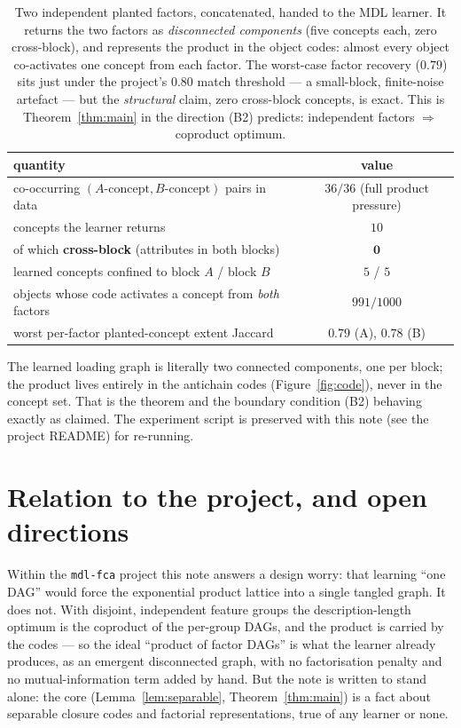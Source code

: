 \documentclass[11pt]{article}
\theoremstyle{definition}
\theoremstyle{plain}
\theoremstyle{remark}
\begin{document}
\begin{table}[h]
\centering
\begin{tabular}{lc}
\toprule
quantity & value \\
\midrule
co-occurring $(A\text{-concept},B\text{-concept})$ pairs in data & $36/36$ (full product pressure) \\
concepts the learner returns & $10$ \\
\quad of which \textbf{cross-block} (attributes in both blocks) & $\mathbf{0}$ \\
learned concepts confined to block $A$ / block $B$ & $5$ / $5$ \\
objects whose code activates a concept from \emph{both} factors & $991/1000$ \\
worst per-factor planted-concept extent Jaccard & $0.79$ (A), $0.78$ (B) \\
\bottomrule
\end{tabular}
\caption{Two independent planted factors, concatenated, handed to the MDL learner.
It returns the two factors as \emph{disconnected components} (five concepts each,
zero cross-block), and represents the product in the object codes: almost every
object co-activates one concept from each factor. The worst-case factor recovery
($0.79$) sits just under the project's $0.80$ match threshold --- a small-block,
finite-noise artefact --- but the \emph{structural} claim, zero cross-block
concepts, is exact. This is Theorem~\ref{thm:main} in the direction (B2) predicts:
independent factors $\Rightarrow$ coproduct optimum.}
\label{tab:experiment}
\end{table}

The learned loading graph is literally two connected components, one per block;
the product lives entirely in the antichain codes (Figure~\ref{fig:code}), never
in the concept set. That is the theorem and the boundary condition (B2) behaving
exactly as claimed. The experiment script is preserved with this note (see the
project README) for re-running.

\section{Relation to the project, and open directions}
\label{sec:project}

Within the \texttt{mdl-fca} project this note answers a design worry: that
learning ``one DAG'' would force the exponential product lattice into a single
tangled graph. It does not. With disjoint, independent feature groups the
description-length optimum is the coproduct of the per-group DAGs, and the product
is carried by the codes --- so the ideal ``product of factor DAGs'' is what the
learner already produces, as an emergent disconnected graph, with no factorisation
penalty and no mutual-information term added by hand. But the note is written to
stand alone: the core (Lemma~\ref{lem:separable}, Theorem~\ref{thm:main}) is a
fact about separable closure codes and factorial representations, true of any
learner or none.
\end{document}
